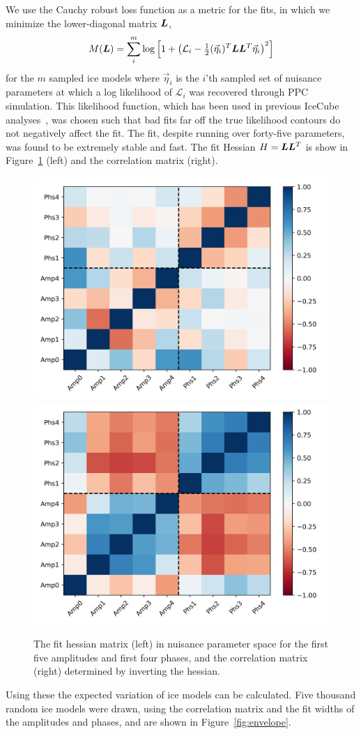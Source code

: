 \documentclass[main.tex]{subfiles}
\begin{document}
We use the Cauchy robust loss function as a metric for the fits, in which we minimize the lower-diagonal matrix $\bm{L}$,
\begin{equation}
    M(\bm{L}) = \sum_{i}^{m}\log\left[ 1 +  \left(\mathcal{L}_{i} - \tfrac{1}{2}(\vec{\eta}_{i})^{T} \bm{L}\bm{L}^{T} \vec{\eta}_ {i} \right)^{2}\right]
\end{equation}
for the $m$ sampled ice models where $\vec{\eta}_{i}$ is the $i$'th sampled set of nuisance parameters at which a log likelihood of $\mathcal{L}_{i}$ was recovered through PPC simulation. 
This likelihood function, which has been used in previous IceCube analyses~\cite{icecube_lowe}, was chosen such that bad fits far off the true likelihood contours do not negatively affect the fit.  
The fit, despite running over forty-five parameters, was found to be extremely stable and fast. The fit Hessian $H=\bm{L}\bm{L}^{T}$ is show in Figure~\ref{fig:hessian} (left) and the correlation matrix (right).
\begin{figure}
    \centering
    \includegraphics[width=0.45\linewidth]{figures/hessian.png}%
    \includegraphics[width=0.45\linewidth]{figures/covariance.png}
    \caption{The fit hessian matrix (left) in nuisance parameter space for the first five amplitudes and first four phases, and the correlation matrix (right) determined by inverting the hessian.}\label{fig:hessian}
\end{figure}

Using these the expected variation of ice models can be calculated. 
Five thousand random ice models were drawn, using the correlation matrix and the fit widths of the amplitudes and phases, and are shown in Figure~\ref{fig:envelope}.
\end{document}
